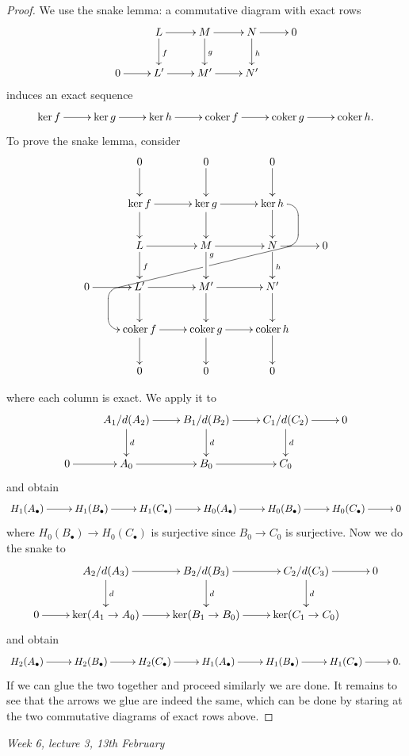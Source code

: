 \documentclass{article}
\newcommand{\coker}{\operatorname{coker}}
\theoremstyle{definition}
\begin{document}
\begin{proof}
We use the snake lemma: a commutative diagram with exact rows
\[
\xymatrix{
& L\ar[r]\ar[d]^f & M\ar[r]\ar[d]^g & N\ar[r]\ar[d]^h & 0 \\
0\ar[r] & L'\ar[r] & M'\ar[r] & N'
}
\]
induces an exact sequence
\[
\xymatrix{
\ker f\ar[r] & \ker g\ar[r] & \ker h\ar[r] & \coker f\ar[r] & \coker g\ar[r] & \coker h.
}
\]
To prove the snake lemma, consider
\[
\xymatrix{
& 0 & 0 & 0 \\
& {\ker f} \ar[r] & {\ker g} \ar[r] & {\ker h} \ar@{-}`r[d]`[d] & \\
& L \ar[r] & M \ar[r] & N \ar[r] \ar@{}+<0.6cm,0cm>="p1" & 0 \\
0 \ar[r] & L' \ar[r] \ar@{}[l]+<1cm,0cm>="p2" \ar`_l[l]+<1.03cm,0cm>`[d]`[d][d] & M' \ar[r] & N' \\
& {\coker f} \ar[r] & {\coker g} \ar[r] & {\coker h} \\
& 0 & 0 & 0
\ar"1,2";"2,2" \ar"1,3";"2,3" \ar"1,4";"2,4"
\ar"2,2";"3,2" \ar"2,3";"3,3" \ar"2,4";"3,4"
\ar"3,2";"4,2"^f \ar"3,3";"4,3"^<<g \ar"3,4";"4,4"^h
\ar"4,2";"5,2" \ar"4,3";"5,3" \ar"4,4";"5,4"
\ar"5,2";"6,2" \ar"5,3";"6,3" \ar"5,4";"6,4"
\ar@{-}"p1";"p2"|!{"2,3";"3,3"}\hole
}
\]

where each column is exact. We apply it to
\[
\xymatrix{
& A_1/d(A_2)\ar[r]\ar[d]^d & B_1/d(B_2)\ar[r]\ar[d]^d & C_1/d(C_2)\ar[r]\ar[d]^d & 0 \\
0\ar[r] & A_0\ar[r] & B_0\ar[r] & C_0
}
\]
and obtain
\[
\xymatrix{
H_1(A_\bullet)\ar[r] & H_1(B_\bullet)\ar[r] & H_1(C_\bullet)\ar[r] & H_0(A_\bullet)\ar[r] & H_0(B_\bullet)\ar[r] & H_0(C_\bullet)\ar[r] & 0
}
\]
where $H_0(B_\bullet)\rightarrow H_0(C_\bullet)$ is surjective since $B_0\rightarrow C_0$ is surjective. Now we do the snake to
\[
\xymatrix{
& A_2/d(A_3)\ar[r]\ar[d]^d & B_2/d(B_3)\ar[r]\ar[d]^d & C_2/d(C_3)\ar[r]\ar[d]^d & 0 \\
0\ar[r] & \ker(A_1\rightarrow A_0)\ar[r] & \ker(B_1\rightarrow B_0)\ar[r] & \ker(C_1\rightarrow C_0)
}
\]
and obtain
\[
\xymatrix{
H_2(A_\bullet)\ar[r] & H_2(B_\bullet)\ar[r] & H_2(C_\bullet)\ar[r] & H_1(A_\bullet)\ar[r] & H_1(B_\bullet)\ar[r] & H_1(C_\bullet)\ar[r] & 0.
}
\]
If we can glue the two together and proceed similarly we are done. It remains to see that the arrows we glue are indeed the same, which can be done by staring at the two commutative diagrams of exact rows above.
\end{proof}

\begin{flushright}
\textit{Week 6, lecture 3, 13th February}
\end{flushright}
\end{document}
